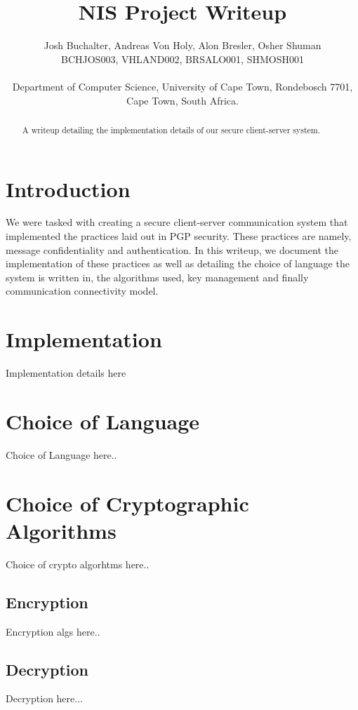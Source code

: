 \documentclass[a4paper,10pt]{article}
\title{\bf NIS Project Writeup}
\author{Josh Buchalter, Andreas Von Holy, Alon Bresler, Osher Shuman \\
BCHJOS003, VHLAND002, BRSALO001, SHMOSH001 \\\\
Department of Computer Science, University of Cape Town, Rondebosch 7701, \\Cape Town, South Africa.}
\begin{document}
\maketitle

\begin{abstract}
A writeup detailing the implementation details of our secure client-server system.
\end{abstract}

\section{Introduction}
We were tasked with creating a secure client-server communication system that implemented the practices laid out in PGP security. These practices are namely, message confidentiality and authentication. In this writeup, we document the implementation of these practices as well as detailing the choice of language the system is written in, the algorithms used, key management and finally communication connectivity model.
\section{Implementation}
Implementation details here
\section{Choice of Language}
Choice of Language here..
\section{Choice of Cryptographic Algorithms}
Choice of crypto algorhtms here..
\subsection{Encryption}
Encryption algs here..

\subsection{Decryption}
Decryption here...
\end{document}
